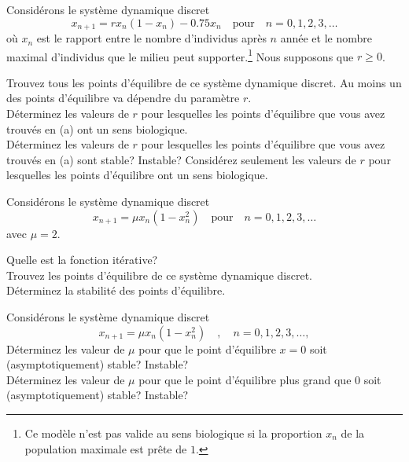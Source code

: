 \begin{question}[\life]
Considérons le système dynamique discret
\[
x_{n+1} = rx_n (1-x_n) - 0.75 x_n \quad \text{pour} \quad n=0, 1, 2,
3, \ldots
\]
où $x_n$ est le rapport entre le nombre d'individus après $n$ année et le
nombre maximal d'individus que le milieu peut supporter.\footnote{Ce modèle
n'est pas valide au sens biologique si la proportion $x_n$ de la
population maximale est prête de $1$.}  Nous supposons que
$r\geq 0$.

 Trouvez tous les points d'équilibre de ce système dynamique
discret.  Au moins un des points d'équilibre va dépendre du paramètre
$r$.\\
 Déterminez les valeurs de $r$ pour lesquelles les points
d'équilibre que vous avez trouvés en (a) ont un sens biologique.\\
 Déterminez les valeurs de $r$ pour lesquelles les points
d'équilibre que vous avez trouvés en (a) sont stable? Instable?
Considérez seulement les valeurs de $r$ pour lesquelles les points
d'équilibre ont un sens biologique.
\label{6Q107}
\end{question}

\begin{question}[\life]
Considérons le système dynamique discret
\[
x_{n+1} = \mu x_n ( 1- x_n^2) \quad \text{pour} \quad n=0, 1, 2, 3,
\ldots
\]
avec $\mu = 2$.

 Quelle est la fonction itérative?\\
 Trouvez les points d'équilibre de ce système dynamique discret.\\
 Déterminez la stabilité des points d'équilibre.
\label{6Q108}
\end{question}

\begin{question}[\life]
Considérons le système dynamique discret
\[
x_{n+1} = \mu x_n ( 1- x_n^2)\quad , \quad n=0, 1, 2, 3, \ldots ,
\]
 Déterminez les valeur de $\mu$ pour que le point d'équilibre
$x=0$ soit (asymptotiquement) stable?  Instable?\\
 Déterminez les valeur de $\mu$ pour que le point d'équilibre
plus grand que $0$ soit (asymptotiquement) stable?  Instable?
\label{6Q109}
\end{question}

